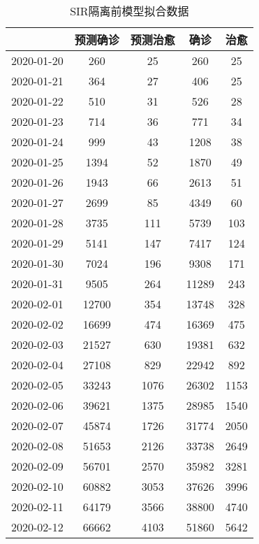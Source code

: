 \begin{longtable}{ccccc}
\caption{SIR隔离前模型拟合数据}\\
\hline
&预测确诊&预测治愈&确诊&治愈\\
\hline
2020-01-20&260&25&260&25\\
2020-01-21&364&27&406&25\\
2020-01-22&510&31&526&28\\
2020-01-23&714&36&771&34\\
2020-01-24&999&43&1208&38\\
2020-01-25&1394&52&1870&49\\
2020-01-26&1943&66&2613&51\\
2020-01-27&2699&85&4349&60\\
2020-01-28&3735&111&5739&103\\
2020-01-29&5141&147&7417&124\\
2020-01-30&7024&196&9308&171\\
2020-01-31&9505&264&11289&243\\
2020-02-01&12700&354&13748&328\\
2020-02-02&16699&474&16369&475\\
2020-02-03&21527&630&19381&632\\
2020-02-04&27108&829&22942&892\\
2020-02-05&33243&1076&26302&1153\\
2020-02-06&39621&1375&28985&1540\\
2020-02-07&45874&1726&31774&2050\\
2020-02-08&51653&2126&33738&2649\\
2020-02-09&56701&2570&35982&3281\\
2020-02-10&60882&3053&37626&3996\\
2020-02-11&64179&3566&38800&4740\\
2020-02-12&66662&4103&51860&5642\\
\hline
\end{longtable}